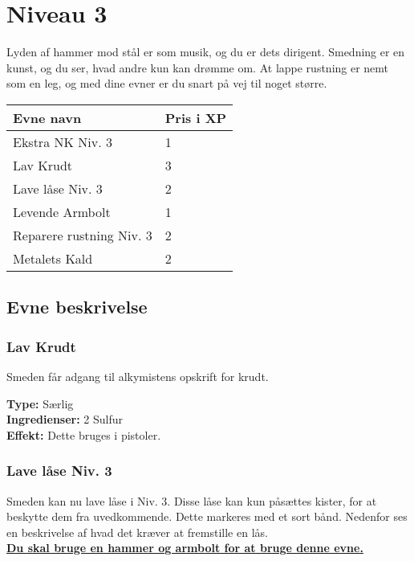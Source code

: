 \chapter{Niveau 3}
Lyden af hammer mod stål er som musik, og du er dets dirigent. Smedning er en kunst, og du ser, hvad andre kun kan drømme om. At lappe rustning er nemt som en leg, og med dine evner er du snart på vej til noget større.

\begin{table}[H]
    \centering
    \begin{tabular}{|p{}|p{}|}
    \rowcolor{cerulean!80}\hline
        Evne navn & Pris i XP \\\hline
        Ekstra NK Niv. 3 & 1 \\\hline
        Lav Krudt & 3 \\\hline
        Lave låse Niv. 3 & 2 \\\hline
        Levende Armbolt & 1 \\\hline
        Reparere rustning Niv. 3 & 2\\\hline
        Metalets Kald & 2\\\hline
    \end{tabular}
\end{table}
\section{Evne beskrivelse}



\subsection{Lav Krudt}
Smeden får adgang til alkymistens opskrift for krudt.
\begin{særlig*}[Krudt]
    \textbf{Type:} Særlig\\
    \textbf{Ingredienser:} 2 Sulfur\\
    \textbf{Effekt:} Dette bruges i pistoler.\\
\end{særlig*}

\subsection{Lave låse Niv. 3}
Smeden kan nu lave låse i Niv. 3. Disse låse kan kun påsættes kister, for at beskytte dem fra uvedkommende. Dette markeres med et sort bånd. Nedenfor ses en beskrivelse af hvad det kræver at fremstille en lås.\\
\textbf{\underline{Du skal bruge en hammer og armbolt for at bruge denne evne.}}

